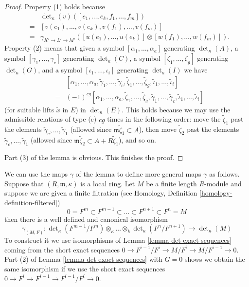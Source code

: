 \begin{proof}
\medskip\noindent
Property (1) holds because
\begin{eqnarray*}
& & \det\nolimits_\kappa(v)([e_1, \ldots, e_k, f_1, \ldots, f_m]) \\
& = &
[v(e_1), \ldots, v(e_k), v(f_1), \ldots, v(f_m)] \\
& = &
\gamma_{K' \to L' \to M'}([u(e_1), \ldots, u(e_k)]
\otimes [w(f_1), \ldots, w(f_m)]).
\end{eqnarray*}
Property (2) means that given a symbol
$[\alpha_1, \ldots, \alpha_a]$ generating $\det_\kappa(A)$,
a symbol $[\gamma_1, \ldots, \gamma_c]$ generating $\det_\kappa(C)$,
a symbol $[\zeta_1, \ldots, \zeta_g]$ generating $\det_\kappa(G)$, and
a symbol $[\iota_1, \ldots, \iota_i]$ generating $\det_\kappa(I)$
we have
\begin{eqnarray*}
& & [\alpha_1, \ldots, \alpha_a, \tilde\gamma_1, \ldots, \tilde\gamma_c,
\tilde\zeta_1, \ldots, \tilde\zeta_g, \tilde\iota_1, \ldots, \tilde\iota_i] \\
& = &
(-1)^{cg} [\alpha_1, \ldots, \alpha_a, \tilde\zeta_1, \ldots, \tilde\zeta_g,
\tilde\gamma_1, \ldots, \tilde\gamma_c, \tilde\iota_1, \ldots, \tilde\iota_i]
\end{eqnarray*}
(for suitable lifts $\tilde{x}$ in $E$) in $\det_\kappa(E)$.
This holds because we may use the admissible relations of type (c)
$cg$ times in the following order: move the
$\tilde\zeta_1$ past the elements
$\tilde\gamma_c, \ldots, \tilde\gamma_1$
(allowed since $\mathfrak m\tilde\zeta_1 \subset A$),
then move $\tilde\zeta_2$ past the elements
$\tilde\gamma_c, \ldots, \tilde\gamma_1$
(allowed since $\mathfrak m\tilde\zeta_2 \subset A + R\tilde\zeta_1$),
and so on.

\medskip\noindent
Part (3) of the lemma is obvious.
This finishes the proof.
\end{proof}

\noindent
We can use the maps $\gamma$ of the lemma to define more general maps
$\gamma$ as follows. Suppose that $(R, \mathfrak m, \kappa)$ is a
local ring. Let $M$ be a finite length $R$-module and suppose we
are given a finite filtration (see
Homology, Definition \ref{homology-definition-filtered})
$$
0 = F^m \subset F^{m - 1} \subset \ldots \subset F^{n + 1} \subset F^n = M
$$
then there is a well defined and canonical isomorphism
$$
\gamma_{(M, F)} :
\det\nolimits_\kappa(F^{m - 1}/F^m) \otimes_\kappa \ldots \otimes_k 
\det\nolimits_\kappa(F^n/F^{n + 1})
\longrightarrow
\det\nolimits_\kappa(M)
$$
To construct it we use isomorphisms of Lemma \ref{lemma-det-exact-sequences}
coming from the short exact sequences
$0 \to F^{i - 1}/F^i \to M/F^i \to M/F^{i - 1} \to 0$.
Part (2) of Lemma \ref{lemma-det-exact-sequences} with $G = 0$ shows
we obtain the same isomorphism if we use the short exact sequences
$0 \to F^i \to F^{i - 1} \to F^{i - 1}/F^i \to 0$.

